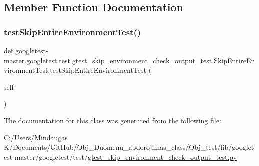 \subsection{Member Function Documentation}
\mbox{\label{classgoogletest-master_1_1googletest_1_1test_1_1gtest__skip__environment__check__output__test_1_1_skip_entire_environment_test_a12d222e6b5ea815368a420b20914d503}} 
\subsubsection{\texorpdfstring{testSkipEntireEnvironmentTest()}{testSkipEntireEnvironmentTest()}}
{\footnotesize\ttfamily def googletest-\/master.\+googletest.\+test.\+gtest\+\_\+skip\+\_\+environment\+\_\+check\+\_\+output\+\_\+test.\+Skip\+Entire\+Environment\+Test.\+test\+Skip\+Entire\+Environment\+Test (\begin{DoxyParamCaption}\item[{}]{self }\end{DoxyParamCaption})}



The documentation for this class was generated from the following file\+:\begin{DoxyCompactItemize}
\item 
C\+:/\+Users/\+Mindaugas K/\+Documents/\+Git\+Hub/\+Obj\+\_\+\+Duomenu\+\_\+apdorojimas\+\_\+class/\+Obj\+\_\+test/lib/googletest-\/master/googletest/test/\mbox{\hyperlink{_obj__test_2lib_2googletest-master_2googletest_2test_2gtest__skip__environment__check__output__test_8py}{gtest\+\_\+skip\+\_\+environment\+\_\+check\+\_\+output\+\_\+test.\+py}}\end{DoxyCompactItemize}
